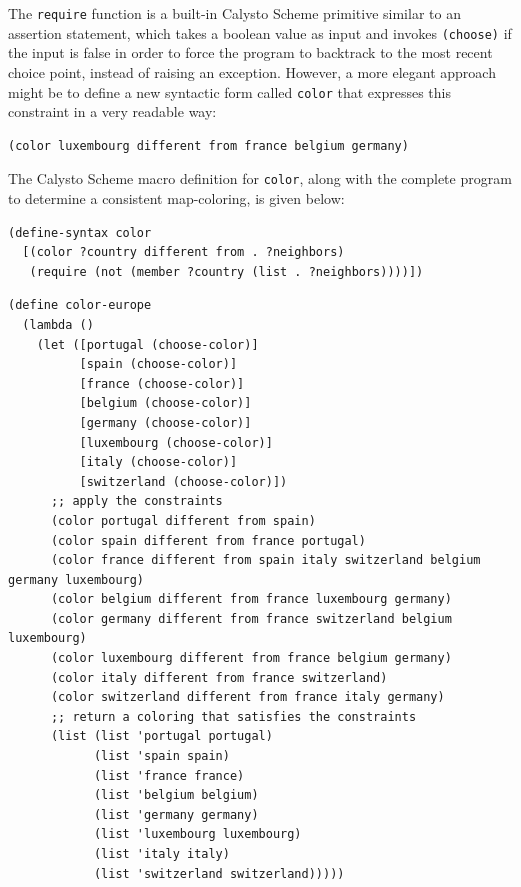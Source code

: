 \documentclass[acmsmall,screen,authorversion]{acmart}
\begin{document}
\noindent
The \texttt{require} function is a built-in Calysto Scheme primitive similar to
an assertion statement, which takes a boolean value as input and invokes
\texttt{(choose)} if the input is false in order to force the program to
backtrack to the most recent choice point, instead of raising an exception.
However, a more elegant approach might be to define a new syntactic form called
\texttt{color} that expresses this constraint in a very readable way:

{\small
\begin{verbatim}
(color luxembourg different from france belgium germany)
\end{verbatim}
}

\noindent
The Calysto Scheme macro definition for \texttt{color}, along with the complete
program to determine a consistent map-coloring, is given below:

{\small
\begin{verbatim}
(define-syntax color
  [(color ?country different from . ?neighbors)
   (require (not (member ?country (list . ?neighbors))))])
\end{verbatim}
}

\noindent
\begin{minipage}{\textwidth}
{\small
\begin{verbatim}
(define color-europe
  (lambda ()
    (let ([portugal (choose-color)]
          [spain (choose-color)]
          [france (choose-color)]
          [belgium (choose-color)]
          [germany (choose-color)]
          [luxembourg (choose-color)]
          [italy (choose-color)]
          [switzerland (choose-color)])
      ;; apply the constraints
      (color portugal different from spain)
      (color spain different from france portugal)
      (color france different from spain italy switzerland belgium germany luxembourg)
      (color belgium different from france luxembourg germany)
      (color germany different from france switzerland belgium luxembourg)
      (color luxembourg different from france belgium germany)
      (color italy different from france switzerland)
      (color switzerland different from france italy germany)
      ;; return a coloring that satisfies the constraints
      (list (list 'portugal portugal)
            (list 'spain spain)
            (list 'france france)
            (list 'belgium belgium)
            (list 'germany germany)
            (list 'luxembourg luxembourg)
            (list 'italy italy)
            (list 'switzerland switzerland)))))

\end{verbatim}
}
\end{minipage}
\end{document}
